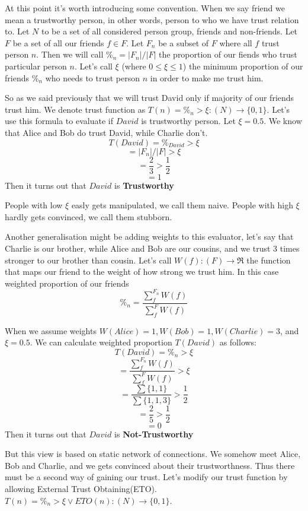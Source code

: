 \documentclass[nostrict]{szablonPG}
\begin{document}
At this point it's worth introducing some convention. When we say friend we mean a trustworthy person, in other words, person to who we have trust relation to. Let $N$ to be a set of all considered person group, friends and non-friends. Let $F$ be a set of all our friends $f \in F$. Let $F_n$ be a subset of $F$ where all $f$ trust person $n$. Then we will call $\%_n = |F_n|/|F|$ the proportion of our fiends who trust particular person $n$. Let's call $\xi$ (where $0 \le \xi \leq 1$) the minimum proportion of our friends $\%_n$ who needs to trust person $n$ in order to make me trust him. 

So as we said previously that we will trust David only if majority of our friends trust him. We denote trust function as $T(n) = \%_n > \xi : (N) \rightarrow \{0,1\}$. 
Let's use this formula to evaluate if $David$ is trustworthy person. Let $\xi = 0.5$. We know that Alice and Bob do trust David, while Charlie don't.
\[T(David) = \%_{David} > \xi\]
\[= |F_n|/|F| > \xi\]
\[= \frac{2}{3} > \frac{1}{2}\]
\[= 1\]
Then it turns out that $David$ is \textbf{Trustworthy}


People with low $\xi$ easly gets manipulated, we call them naive.
People with high $\xi$ hardly gets convinced, we call them stubborn. 

Another generalisation might be adding weights to this evaluator, let's say that Charlie is our brother, while Alice and Bob are our cousins, and we trust 3 times stronger to our brother than cousin. Let's call $W(f): (F) \rightarrow \Re$ the function that maps our friend to the weight of how strong we trust him. In this case weighted proportion of our friends \[\%_n = \frac{\sum\limits_f^{F_n} W(f)}{\sum\limits_f^{F} W(f)}\]

When we assume weights $W(Alice) = 1, W(Bob) = 1, W(Charlie) = 3$, and $\xi = 0.5$. We can calculate weighted proportion $T(David)$ as follows:
\[T(David) = \%_n > \xi\]
\[= \frac{\sum\limits_f^{F_n} W(f)}{\sum\limits_f^{F} W(f)} > \xi\]
\[= \frac{\sum \{1,1\}}{\sum\{1,1,3\}} > \frac{1}{2}\]
\[= \frac{2}{5} > \frac{1}{2}\]
\[= 0\]
Then it turns out that $David$ is \textbf{Not-Trustworthy}

But this view is based on static network of connections. We somehow meet Alice, Bob and Charlie, and we gets convinced about their trustworthness. Thus there must be a second way of gaining our trust. Let's modify our trust function by allowing External Trust Obtaining(ETO). $T(n) = \%_n > \xi \lor ETO(n) : (N) \rightarrow \{0,1\}$. 
\end{document}
